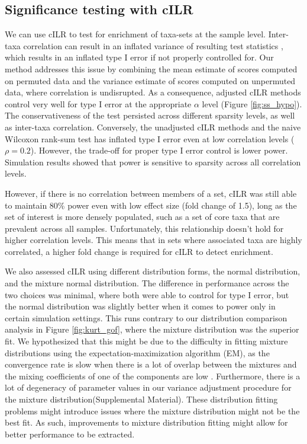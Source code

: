 \documentclass{article}
\begin{document}
\subsection*{Significance testing with cILR}
We can use cILR to test for enrichment of taxa-sets at the sample level. Inter-taxa correlation can result in an inflated variance of resulting test statistics \cite{wu2012}, which results in an inflated type I error if not properly controlled for. Our method addresses this issue by combining the mean estimate of scores computed on permuted data and the variance estimate of scores computed on unpermuted data, where correlation is undisrupted. As a consequence, adjusted cILR methods control very well for type I error at the appropriate $\alpha$ level (Figure \ref{fig:ss_hypo}). The conservativeness of the test persisted across different sparsity levels, as well as inter-taxa correlation. Conversely, the unadjusted cILR methods and the naive Wilcoxon rank-sum test has inflated type I error even at low correlation levels ($\rho = 0.2$). However, the trade-off for proper type I error control is lower power. Simulation results showed that power is sensitive to sparsity across all correlation levels. 

However, if there is no correlation between members of a set, cILR was still able to maintain 80\% power even with low effect size (fold change of 1.5), long as the set of interest is more densely populated, such as a set of core taxa that are prevalent across all samples. Unfortunately, this relationship doesn't hold for higher correlation levels. This means that in sets where associated taxa are highly correlated, a higher fold change is required for cILR to detect enrichment. 

We also assessed cILR using different distribution forms, the normal distribution, and the mixture normal distribution. The difference in performance across the two choices was minimal, where both were able to control for type I error, but the normal distribution was slightly better when it comes to power only in certain simulation settings. This runs contrary to our distribution comparison analysis in Figure \ref{fig:kurt_gof}, where the mixture distribution was the superior fit. We hypothesized that this might be due to the difficulty in fitting mixture distributions using the expectation-maximization algorithm (EM), as the convergence rate is slow when there is a lot of overlap between the mixtures and the mixing coefficients of one of the components are low \cite{naim2012}. Furthermore, there is a lot of degeneracy of parameter values in our variance adjustment procedure for the mixture distribution(Supplemental Material). These distribution fitting problems might introduce issues where the mixture distribution might not be the best fit. As such, improvements to mixture distribution fitting might allow for better performance to be extracted.  
\end{document}
